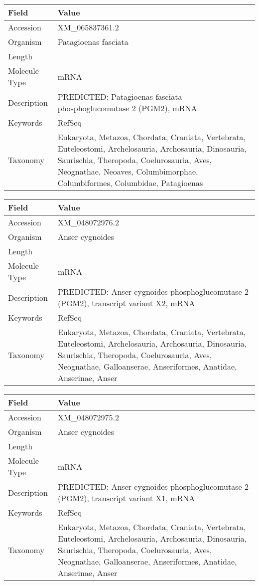 \documentclass[10pt]{article}
\begin{document}
\vspace{1em}
{\footnotesize
\begin{longtable}{>{\raggedright\arraybackslash}p{4.5cm} >{\raggedright\arraybackslash}p{11.5cm}}
\textbf{Field} & \textbf{Value} \\
\hline
Accession & XM\_065837361.2 \\
Organism & Patagioenas fasciata \\
Length & 2226 \\
Molecule Type & mRNA \\
Description & PREDICTED: Patagioenas fasciata phosphoglucomutase 2 (PGM2), mRNA \\
Keywords & RefSeq \\
Taxonomy & Eukaryota, Metazoa, Chordata, Craniata, Vertebrata, Euteleostomi, Archelosauria, Archosauria, Dinosauria, Saurischia, Theropoda, Coelurosauria, Aves, Neognathae, Neoaves, Columbimorphae, Columbiformes, Columbidae, Patagioenas \\
\end{longtable}
}

\vspace{1em}
{\footnotesize
\begin{longtable}{>{\raggedright\arraybackslash}p{4.5cm} >{\raggedright\arraybackslash}p{11.5cm}}
\textbf{Field} & \textbf{Value} \\
\hline
Accession & XM\_048072976.2 \\
Organism & Anser cygnoides \\
Length & 2583 \\
Molecule Type & mRNA \\
Description & PREDICTED: Anser cygnoides phosphoglucomutase 2 (PGM2), transcript variant X2, mRNA \\
Keywords & RefSeq \\
Taxonomy & Eukaryota, Metazoa, Chordata, Craniata, Vertebrata, Euteleostomi, Archelosauria, Archosauria, Dinosauria, Saurischia, Theropoda, Coelurosauria, Aves, Neognathae, Galloanserae, Anseriformes, Anatidae, Anserinae, Anser \\
\end{longtable}
}

\vspace{1em}
{\footnotesize
\begin{longtable}{>{\raggedright\arraybackslash}p{4.5cm} >{\raggedright\arraybackslash}p{11.5cm}}
\textbf{Field} & \textbf{Value} \\
\hline
Accession & XM\_048072975.2 \\
Organism & Anser cygnoides \\
Length & 2828 \\
Molecule Type & mRNA \\
Description & PREDICTED: Anser cygnoides phosphoglucomutase 2 (PGM2), transcript variant X1, mRNA \\
Keywords & RefSeq \\
Taxonomy & Eukaryota, Metazoa, Chordata, Craniata, Vertebrata, Euteleostomi, Archelosauria, Archosauria, Dinosauria, Saurischia, Theropoda, Coelurosauria, Aves, Neognathae, Galloanserae, Anseriformes, Anatidae, Anserinae, Anser \\
\end{longtable}
}
\end{document}

